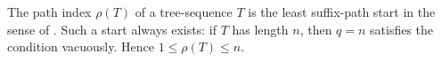 \begin{definition}
The path index \(\rho(T)\) of a tree-sequence \(T\) is the least suffix-path
start in the sense of .  Such a start always
exists: if \(T\) has length \(n\), then \(q=n\) satisfies the condition
vacuously.  Hence \(1\le\rho(T)\le n\).
\end{definition}
